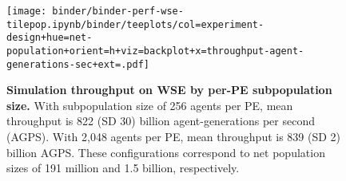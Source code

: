 \begin{figure}
\texttt{[image: binder/binder-perf-wse-tilepop.ipynb/binder/teeplots/col=experiment-design+hue=net-population+orient=h+viz=backplot+x=throughput-agent-generations-sec+ext=.pdf]}

\caption{
\textbf{Simulation throughput on WSE by per-PE subpopulation size.}
\footnotesize
With subpopulation size of 256 agents per PE, mean throughput is 822 (SD 30) billion agent-generations per second (AGPS).
With 2,048 agents per PE, mean throughput is 839 (SD 2) billion AGPS.
These configurations correspond to net population sizes of 191 million and 1.5 billion, respectively.
}
\label{fig:perf-tilepop}

\end{figure}
